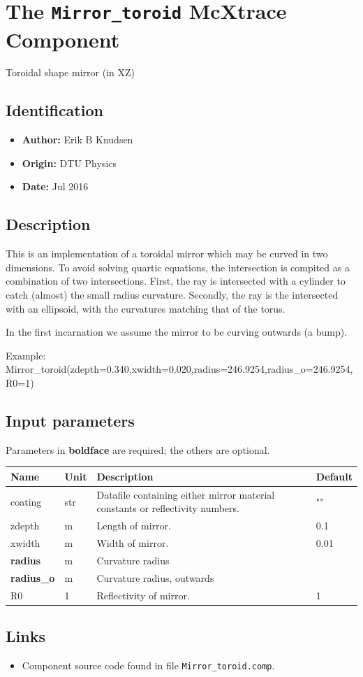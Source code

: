 \section{The \texttt{Mirror\_toroid} McXtrace Component}
Toroidal shape mirror (in XZ)

\subsection*{Identification}
\begin{itemize}
  \item \textbf{Author:} Erik B Knudsen
  \item \textbf{Origin:} DTU Physics
  \item \textbf{Date:} Jul 2016
\end{itemize}

\subsection*{Description}
This is an implementation of a toroidal mirror which may be curved in two dimensions. To avoid solving quartic equations, the intersection is compited as a combination of two intersections. First, the ray is intersected with a cylinder to catch (almost) the small radius curvature. Secondly, the ray is the intersected with an ellipsoid, with the curvatures matching that of the torus.

In the first incarnation we assume the mirror to be curving outwards (a bump).

Example: Mirror\_toroid(zdepth=0.340,xwidth=0.020,radius=246.9254,radius\_o=246.9254,R0=1)

\subsection*{Input parameters}
Parameters in \textbf{boldface} are required; the others are optional.

\begin{longtable}{p{}p{}p{}p{}}
\toprule
\textbf{Name} & \textbf{Unit} & \textbf{Description} & \textbf{Default} \\
\midrule
\endhead
coating & str & Datafile containing either mirror material constants or reflectivity  numbers. & "" \\
zdepth & m & Length of mirror. & 0.1 \\
xwidth & m & Width of mirror. & 0.01 \\
\textbf{radius} & m & Curvature radius &  \\
\textbf{radius\_o} & m & Curvature radius, outwards &  \\
R0 & 1 & Reflectivity of mirror. & 1 \\
\bottomrule
\end{longtable}

\subsection*{Links}
\begin{itemize}
  \item Component source code found in file \texttt{Mirror\_toroid.comp}.
\end{itemize}
